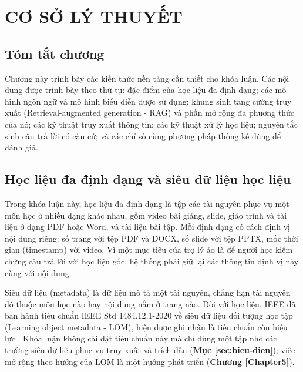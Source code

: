 \chapter{CƠ SỞ LÝ THUYẾT}
\label{Chapter2}

\section*{Tóm tắt chương}

Chương này trình bày các kiến thức nền tảng cần thiết cho khóa luận. Các nội dung được trình bày theo thứ tự: đặc điểm của học liệu đa định dạng; các mô hình ngôn ngữ và mô hình biểu diễn được sử dụng; khung sinh tăng cường truy xuất (Retrieval-augmented generation - RAG) và phần mở rộng đa phương thức của nó; các kỹ thuật truy xuất thông tin; các kỹ thuật xử lý học liệu; nguyên tắc sinh câu trả lời có căn cứ; và các chỉ số cùng phương pháp thống kê dùng để đánh giá.


\section{Học liệu đa định dạng và siêu dữ liệu học liệu}

Trong khóa luận này, học liệu đa định dạng là tập các tài nguyên phục vụ một môn học ở nhiều dạng khác nhau, gồm video bài giảng, slide, giáo trình và tài liệu ở dạng PDF hoặc Word, và tài liệu bài tập. Mỗi định dạng có cách định vị nội dung riêng: số trang với tệp PDF và DOCX, số slide với tệp PPTX, mốc thời gian (timestamp) với video. Vì một mục tiêu của trợ lý ảo là để người học kiểm chứng câu trả lời với học liệu gốc, hệ thống phải giữ lại các thông tin định vị này cùng với nội dung.

\bigbreak\noindent
Siêu dữ liệu (metadata) là dữ liệu mô tả một tài nguyên, chẳng hạn tài nguyên đó thuộc môn học nào hay nội dung nằm ở trang nào. Đối với học liệu, IEEE đã ban hành tiêu chuẩn IEEE Std 1484.12.1-2020 về siêu dữ liệu đối tượng học tập (Learning object metadata - LOM), hiện được ghi nhận là tiêu chuẩn còn hiệu lực \cite{ieee2020lom}. Khóa luận không cài đặt tiêu chuẩn này mà chỉ dùng một tập nhỏ các trường siêu dữ liệu phục vụ truy xuất và trích dẫn (\textbf{Mục \ref{sec:bieu-dien}}); việc mở rộng theo hướng của LOM là một hướng phát triển (\textbf{Chương \ref{Chapter5}}).

